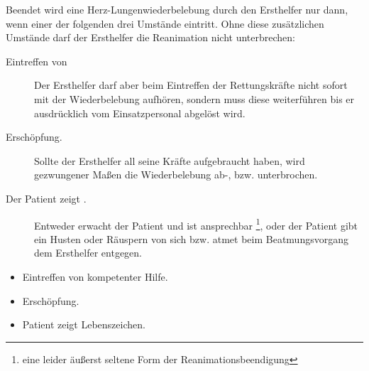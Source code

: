 {
Beendet wird eine Herz-Lungenwiederbelebung durch den Ersthelfer nur
dann, wenn einer der folgenden drei Umstände eintritt. Ohne diese
zusätzlichen Umstände darf der Ersthelfer die Reanimation nicht
unterbrechen: 

\begin{description}
  \item[Eintreffen von ] Der Ersthelfer darf aber beim
  Eintreffen der Rettungskräfte nicht sofort mit der Wiederbelebung  aufhören, sondern muss diese weiterführen
  bis er ausdrücklich vom Einsatzpersonal abgelöst  wird.
  \item[Erschöpfung.] Sollte der Ersthelfer all seine Kräfte aufgebraucht haben,
  wird gezwungener Maßen die Wiederbelebung ab-, bzw. unterbrochen.
  \item[Der Patient zeigt .] Entweder
  erwacht der Patient und ist ansprechbar \footnote{eine
  leider äußerst seltene Form der Reanimationsbeendigung},
  oder der Patient gibt ein Husten oder Räuspern von sich
  bzw. atmet beim Beatmungsvorgang dem Ersthelfer entgegen. 
\end{description}

}{
\begin{itemize}
  \item Eintreffen von kompetenter Hilfe.
  \item Erschöpfung.
  \item Patient zeigt Lebenszeichen.
\end{itemize}
}{}{}{}


 

